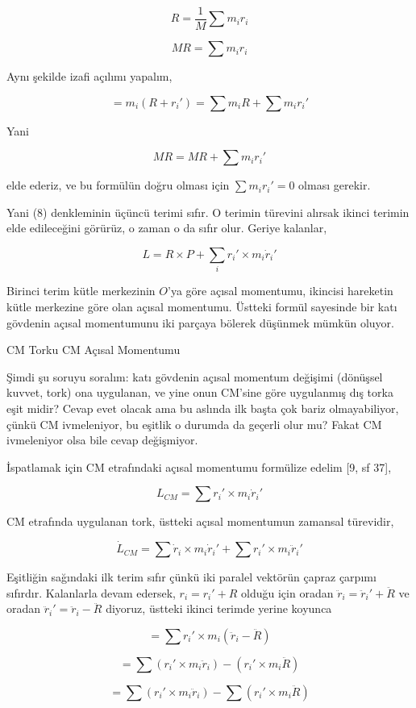 \documentclass[12pt,fleqn]{article}\usepackage{../../common}
\begin{document}
$$
R = \frac{1}{M} \sum m_i r_i
$$

$$
MR = \sum m_i r_i
$$

Aynı şekilde izafi açılımı yapalım,

$$
= m_i (R + r_i') = \sum m_i R + \sum m_i r_i'
$$

Yani

$$
MR = MR + \sum m_i r_i'
$$

elde ederiz, ve bu formülün doğru olması için $\sum m_i r_i' = 0$ olması gerekir.

Yani (8) denkleminin üçüncü terimi sıfır. O terimin türevini alırsak
ikinci terimin elde edileceğini görürüz, o zaman o da sıfır olur. Geriye
kalanlar,

$$
L = R \times P + \sum_i r_i' \times m_i \dot{r}_i' 
$$

Birinci terim kütle merkezinin $O$'ya göre açısal momentumu, ikincisi hareketin
kütle merkezine göre olan açısal momentumu. Üstteki formül sayesinde bir
katı gövdenin açısal momentumunu iki parçaya bölerek düşünmek mümkün oluyor.

CM Torku CM Açısal Momentumu

Şimdi şu soruyu soralım: katı gövdenin açısal momentum değişimi (dönüşsel
kuvvet, tork) ona uygulanan, ve yine onun CM'sine göre uygulanmış dış torka eşit
midir? Cevap evet olacak ama bu aslında ilk başta çok bariz olmayabiliyor, çünkü
CM ivmeleniyor, bu eşitlik o durumda da geçerli olur mu? Fakat CM ivmeleniyor
olsa bile cevap değişmiyor.

İspatlamak için CM etrafındaki açısal momentumu formülize edelim [9, sf 37],

$$
L_{CM} = \sum r_i' \times m_i \dot{r}_i' 
$$

CM etrafında uygulanan tork, üstteki açısal momentumun zamansal türevidir, 

$$
\dot{L}_{CM} = \sum \dot{r}_i \times m_i \dot{r}_i' + \sum r_i' \times m_i\ddot{r}_i'
$$

Eşitliğin sağındaki ilk terim sıfır çünkü iki paralel vektörün çapraz çarpımı
sıfırdır. Kalanlarla devam edersek, $r_i = r_i' + R$ olduğu için oradan
$\ddot{r}_i = \ddot{r}_i' + \ddot{R}$ ve oradan $\ddot{r}_i' = \ddot{r}_i -
\ddot{R}$ diyoruz, üstteki ikinci terimde yerine koyunca

$$
= \sum r_i' \times m_i (\ddot{r}_i - \ddot{R})
$$

$$
= \sum (r_i' \times m_i \ddot{r}_i) - (r_i' \times m_i \ddot{R})
$$

$$
= \sum (r_i' \times m_i \ddot{r}_i) - \sum (r_i' \times m_i \ddot{R})
$$
\end{document}
